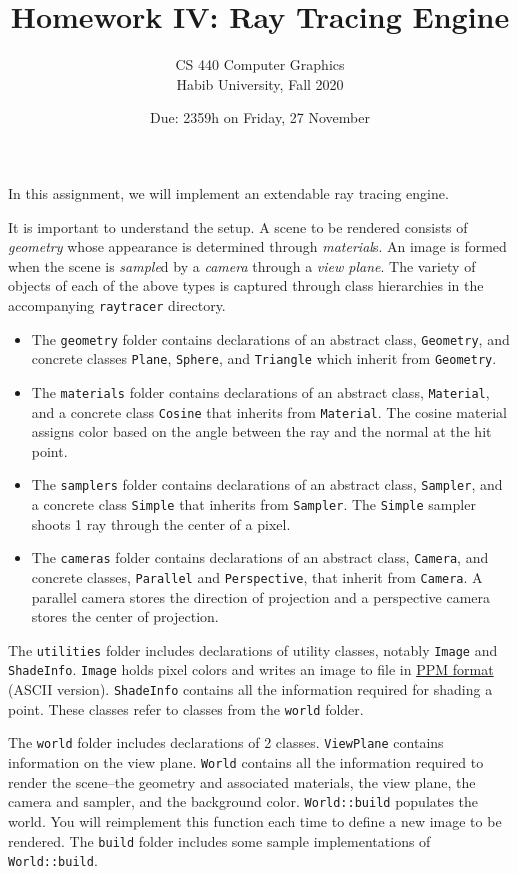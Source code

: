 \documentclass{article}
\title{Homework IV: Ray Tracing Engine}
\author{CS 440 Computer Graphics\\Habib University, Fall 2020}
\date{Due: 2359h on Friday, 27 November}
\begin{document}
\maketitle
\thispagestyle{empty}

In this assignment, we will implement an extendable ray tracing engine.

It is important to understand the setup. A scene to be rendered consists of \emph{geometry} whose appearance is determined through \emph{material}s. An image is formed when the scene is \emph{sample}d by a \emph{camera} through a \emph{view plane}. The variety of objects of each of the above types is captured through class hierarchies in the accompanying \texttt{raytracer} directory.
\begin{itemize}
\item The \texttt{geometry} folder contains declarations of an abstract class, \texttt{Geometry}, and concrete classes  \texttt{Plane}, \texttt{Sphere}, and \texttt{Triangle} which inherit from \texttt{Geometry}.
\item The \texttt{materials} folder contains declarations of an abstract class, \texttt{Material}, and a concrete class  \texttt{Cosine} that inherits from \texttt{Material}. The cosine material assigns color based on the angle between the ray and the normal at the hit point.
\item The \texttt{samplers} folder contains declarations of an abstract class, \texttt{Sampler}, and a concrete class  \texttt{Simple} that inherits from \texttt{Sampler}. The \texttt{Simple} sampler shoots 1 ray through the center of a pixel.
\item The \texttt{cameras} folder contains declarations of an abstract class, \texttt{Camera}, and concrete classes, \texttt{Parallel} and \texttt{Perspective}, that inherit from \texttt{Camera}. A parallel camera stores the direction of projection and a perspective camera stores the center of projection.
\end{itemize}

The \texttt{utilities} folder includes declarations of utility classes, notably \texttt{Image} and \texttt{ShadeInfo}. \texttt{Image} holds pixel colors and writes an image to file in \href{https://en.wikipedia.org/wiki/Netpbm_format#PPM_example}{PPM format} (ASCII version). \texttt{ShadeInfo} contains all the information required for shading a point. These classes refer to classes from the \texttt{world} folder.

The \texttt{world} folder includes declarations of 2 classes. \texttt{ViewPlane} contains information on the view plane. \texttt{World} contains all the information required to render the scene--the geometry and associated materials, the view plane, the camera and sampler, and the background color. \texttt{World::build} populates the world. You will reimplement this function each time to define a new image to be rendered. The \texttt{build} folder includes some sample implementations of \texttt{World::build}.
\end{document}
